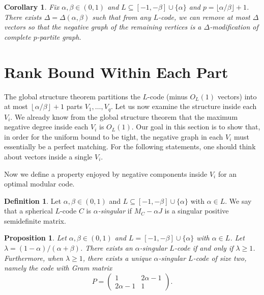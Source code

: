 \documentclass[reqno, 11pt]{amsart}
\newtheorem{proposition}[theorem]{Proposition}
\newtheorem{corollary}[theorem]{Corollary}
\theoremstyle{definition}
\newtheorem{definition}[theorem]{Definition}
\theoremstyle{remark}
\newcommand{\floor}[1]{\left\lfloor #1 \right\rfloor}
\begin{document}
\begin{corollary}\label{cor:global} 
Fix $\alpha, \beta \in (0,1) $ and $L \subseteq [-1,-\beta]\cup\{\alpha\}$ and $p = \lfloor \alpha/ \beta \rfloor + 1$. There exists $\Delta = \Delta(\alpha,\beta)$  such that from any $L$-code, we can remove at most $\Delta$ vectors so that the negative graph of the remaining vertices is a $\Delta$-modification of complete $p$-partite graph.
\end{corollary}



\section{Rank Bound Within Each Part}\label{sec:rank-bound}

The global structure theorem partitions the $L$-code (minus $O_L(1)$ vectors) into at most $\floor{\alpha/\beta} + 1$ parts $V_1, \dots, V_q$.
Let us now examine the structure inside each $V_i$. 
We already know from the global structure theorem that the maximum negative degree inside each $V_i$ is $O_L(1)$. 
Our goal in this section is to show that, in order for the uniform bound to be tight, the negative graph in each $V_i$ must essentially be a perfect matching. 
For the following statements, one should think about vectors inside a single $V_i$.

Now we define a property enjoyed by negative components inside $V_i$ for an optimal modular code.

\begin{definition}\label{def:a-singular}
Let $ \alpha, \beta \in (0,1)$ and $L \subseteq [-1,-\beta] \cup \{\alpha\}$ with $\alpha \in L$. 
We say that a spherical $L$-code $C$ is \textit{$\alpha$-singular} if $M_C- \alpha J$ is a singular positive semidefinite matrix.
\end{definition}

\begin{proposition}\label{prop:a-singular}
Let $\alpha, \beta \in (0,1)$ and $L = [-1,-\beta] \cup \{\alpha\}$ with $\alpha \in L$.
Let $\lambda = (1-\alpha)/(\alpha + \beta)$. 
There exists an $\alpha$-singular $L$-code if and only if $\lambda \ge 1$. Furthermore, when $\lambda \ge 1$, there exists a unique $\alpha$-singular $L$-code of size two, namely the code with Gram matrix
\[
P = \begin{pmatrix}
            1 & 2\alpha - 1 \\
            2\alpha - 1 & 1
        \end{pmatrix}.
\]
\end{proposition}
\end{document}
